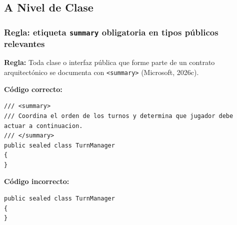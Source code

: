 \subsection{A Nivel de Clase}

\subsubsection{Regla: etiqueta \texttt{summary} obligatoria en tipos públicos relevantes}

\textbf{Regla:} Toda clase o interfaz pública que forme parte de un contrato arquitectónico se documenta con \texttt{<summary>} (Microsoft, 2026c).

\textbf{Código correcto:}
\begin{lstlisting}[style=csharpstyle]
/// <summary>
/// Coordina el orden de los turnos y determina que jugador debe actuar a continuacion.
/// </summary>
public sealed class TurnManager
{
}
\end{lstlisting}

\textbf{Código incorrecto:}
\begin{lstlisting}[style=csharpstyle]
public sealed class TurnManager
{
}
\end{lstlisting}
